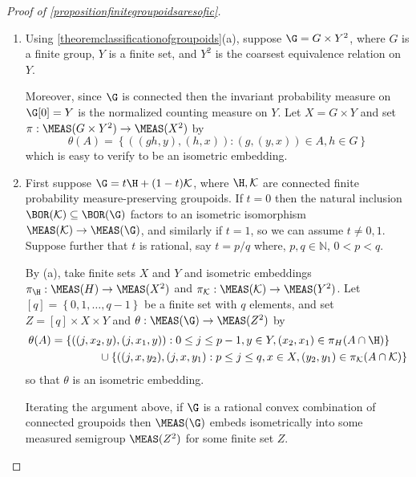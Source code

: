 \begin{proof}[Proof of \ref{propositionfinitegroupoidsaresofic}]
\begin{enumerate}
\item[(a)] Using \ref{theoremclassificationofgroupoids}(a), suppose $\G=G\times Y^2$, where $G$ is a finite group, $Y$ is a finite set, and $Y^2$ is the coarsest equivalence relation on $Y$.

Moreover, since $\G$ is connected then the invariant probability measure on $\G[0]=Y$ is the normalized counting measure on $Y$. Let $X=G\times Y$ and set $\pi:\MEAS(G\times Y^2)\to\MEAS(X^2)$ by
\[\theta(A)=\left\{((gh,y),(h,x)):(g,(y,x))\in A,h\in G\right\}\]
which is easy to verify to be an isometric embedding.
%
\item[(b)] First suppose $\G=t\H+(1-t)\mathcal{K}$, where $\H,\mathcal{K}$ are connected finite probability measure-preserving groupoids. If $t=0$ then the natural inclusion $\BOR(\mathcal{K})\subseteq\BOR(\G)$ factors to an isometric isomorphism $\MEAS(\mathcal{K})\to\MEAS(\G)$, and similarly if $t=1$, so we can assume $t\neq 0,1$. Suppose further that $t$ is rational, say $t=p/q$ where, $p,q\in\mathbb{N}$, $0<p<q$.

By (a), take finite sets $X$ and $Y$ and isometric embeddings $\pi_{\H}:\MEAS(H)\to\MEAS(X^2)$ and $\pi_\mathcal{K}:\MEAS(\mathcal{K})\to\MEAS(Y^2)$. Let $[q]=\left\{0,1,\ldots,q-1\right\}$ be a finite set with $q$ elements, and set $Z=[q]\times X\times Y$ and $\theta:\MEAS(\G)\to\MEAS(Z^2)$ by
\begin{align*}
\theta(A)&=\left\{((j,x_2,y),(j,x_1,y)):0\leq j\leq p-1,y\in Y,(x_2,x_1)\in\pi_H(A\cap \H)\right\}\\
&\hspace{1.5cm}\cup\left\{((j,x,y_2),(j,x,y_1):p\leq j\leq q, x\in X, (y_2,y_1)\in \pi_\mathcal{K}(A\cap\mathcal{K})\right\}
\end{align*}
so that $\theta$ is an isometric embedding.

Iterating the argument above, if $\G$ is a rational convex combination of connected groupoids then $\MEAS(\G)$ embeds isometrically into some measured semigroup $\MEAS(Z^2)$ for some finite set $Z$.


\end{enumerate}
\end{proof}
